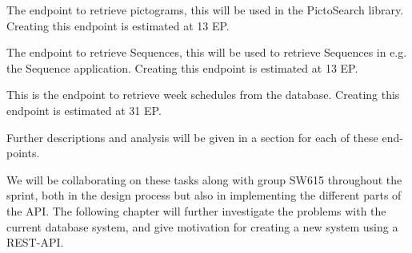 \begin{description}[style=unboxed]
	\item [Endpoint for Pictograms] The endpoint to retrieve pictograms, this will be used in the PictoSearch library.
	Creating this endpoint is estimated at 13 EP.
	\item [Endpoint for Sequences] The endpoint to retrieve Sequences, this will be used to retrieve Sequences in e.g. the Sequence application.
	Creating this endpoint is estimated at 13 EP.
	\item [Endpoint for Week Schedules] This is the endpoint to retrieve week schedules from the database.
	Creating this endpoint is estimated at 31 EP.
\end{description}
Further descriptions and analysis will be given in a section for each of these end-points.

We will be collaborating on these tasks along with group SW615 throughout the sprint, both in the design process but also in implementing the different parts of the API.
The following chapter will further investigate the problems with the current database system, and give motivation for creating a new system using a REST-API.

